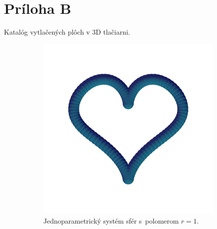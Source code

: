 \chapter{Príloha B}
\label{pri:priloha2}
Katalóg vytlačených plôch v 3D tlačiarni.
\begin{figure}[h]
    \centering
    \captionsetup{justification=centering}
	\captionsetup[subfigure]{justification=centering}
    \begin{subfigure}[t]{0.49\textwidth}
        \centering
        \includegraphics[width=\textwidth, trim=0mm 100mm 0mm 50mm, clip=true]{images/heart_spheres.png}
        	\caption{Jednoparametrický systém sfér s~polomerom $r=1$.}
        \label{fig:plocha11}
    \end{subfigure}
    \hfill
    \begin{subfigure}[t]{0.49\textwidth}
        \centering

\end{subfigure}
\end{figure}
